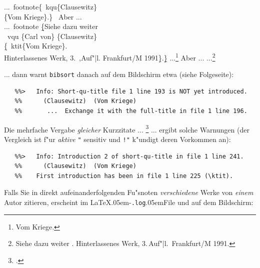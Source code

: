 \documentclass[12pt,a4paper]{article}
\newcommand{\pbs}{\string\ \unskip}
\newcommand{\bs}{\protect\pbs}
\begin{document}
\Doppelbox
{...\bs footnote\{\bs kqu\{Clausewitz\}
 \\ \hspace{2em} \{Vom Kriege\}.\} 
 \ Aber ... \\
 ...\bs footnote \b{\b{\{}}Siehe dazu weiter 
 \\ \hspace{.5em} \bs vqu \{Carl von\}
 \{Clausewitz\} 
 \\ \hspace{2.5em} \b{\{}\bs ktit\{Vom Kriege\}.
 \\ \hspace{3em} Hinterlassenes Werk, 
 3.\bs,Auf\string"|l. Frankfurt/M 1991\b{\}}.\b{\b{\}}}
}
{...\footnote{ {Vom Kriege}.}
 Aber ...
 ...\footnote{Siehe dazu weiter  {.
 Hinterlassenes Werk, 3.\,Auf"|l.\ Frankfurt/M 1991}.}
}

 \noindent
 ... dann warnt \verb|bibsort| danach auf dem
 Bildschirm etwa (siehe Folgeseite):

 \vspace{-.75ex}
  {\scriptsize\begin{verbatim} 
   %%>   Info: Short-qu-title file 1 line 193 is NOT yet introduced.
   %%      (Clausewitz)  (Vom Kriege)  
   %%       ...  Exchange it with the full-title in file 1 line 196.
  \end{verbatim}} %

 \vspace{-2.75ex}\noindent 
 Die mehrfache Vergabe \textit{gleicher} Kurzzitate ... \footnote{.} ... ergibt solche Warnungen
 (der Vergleich ist f"ur \textit{aktive} \verb|"| sensitiv und \verb|!"| 
 k"undigt deren Vorkommen an):

  \vspace{-.75ex}
  {\scriptsize\begin{verbatim} 
   %%>   Info: Introduction 2 of short-qu-title in file 1 line 241.
   %%      (Clausewitz)  (Vom Kriege)
   %%    First introduction has been in file 1 line 225 (\ktit).
  \end{verbatim}}

 \vspace{-2.75ex}\noindent  
 Falls Sie in direkt aufeinanderfolgenden Fu"snoten \textit{verschiedene} 
 Werke von \textit{einem} Autor zitieren, erscheint im 
 \LaTeX\kern.05em-\hspace{-.05em}\verb|.log|\kern.05em\hy File und auf dem 
 Bildschirm:\balabel{DERS}%
\end{document}
